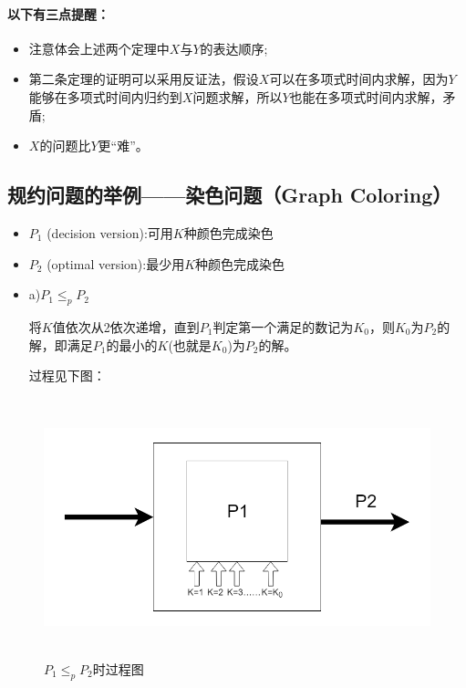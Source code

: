 \paragraph*{以下有三点提醒：}

\begin{itemize}
	\item 注意体会上述两个定理中$X$与$Y$的表达顺序;
\end{itemize}
\begin{itemize}
	\item 第二条定理的证明可以采用反证法，假设$X$可以在多项式时间内求解，因为$Y$能够在多项式时间内归约到$X$问题求解，所以$Y$也能在多项式时间内求解，矛盾;
\end{itemize}
\begin{itemize}
	\item $X$的问题比$Y$更“难”。
\end{itemize}

	\subsection{规约问题的举例——染色问题（Graph Coloring）}

\begin{itemize}
	\item $P_1$ (decision version):可用$K$种颜色完成染色
\end{itemize}
\begin{itemize}
	\item $P_2$ (optimal version):最少用$K$种颜色完成染色
\end{itemize}
\begin{itemize}
	\item a)$P_1\leq_pP_2$
	
将$K$值依次从2依次递增，直到$P_1$判定第一个满足的数记为$K_0$，则$K_0$为$P_2$的解，即满足$P_1$的最小的$K$(也就是$K_0$)为$P_2$的解。

过程见下图：
\end{itemize}

	\begin{figure}[ht]
		\begin{minipage}[t]{1\linewidth}
			\centering
			\includegraphics[width=15cm,height=7.5cm]{image/P_NP2.png}
			\caption{$P_1\leq_pP_2$时过程图}
		\end{minipage}
	\end{figure}

